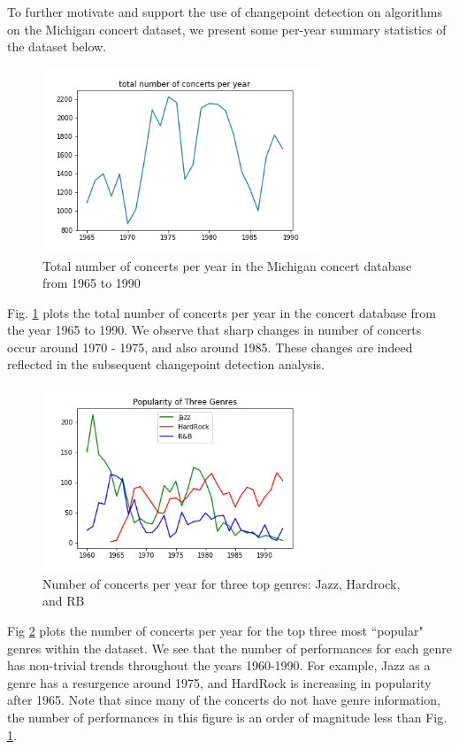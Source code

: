 \documentclass[9pt,twocolumn,twoside,lineno]{pnas-new}
\begin{document}
To further motivate and support the use of changepoint detection on algorithms on the Michigan concert dataset, we present some per-year summary statistics of the dataset below. 
\begin{figure}[!ht]
 \centering
    \includegraphics[width=83mm]{figures/TotalNumberofConcerts.png}
    \caption{Total number of concerts per year in the Michigan concert database from 1965 to 1990} \label {fig:num-concerts}
\end{figure}

Fig. \ref{fig:num-concerts} plots the total number of concerts per year in the concert database from the year 1965 to 1990. We observe that sharp changes in number of concerts occur around 1970 - 1975, and also around 1985. These changes are indeed reflected in the subsequent changepoint detection analysis. 
\begin{figure}[!ht]
 \centering
    \includegraphics[width=83mm]{figures/ThreeGenres.png}
    \caption{Number of concerts per year for three top genres: Jazz, Hardrock, and RB} \label {fig:num-genres}
\end{figure}

Fig \ref{fig:num-genres} plots the number of concerts per year for the top three most ``popular" genres within the dataset. We see that the number of performances for each genre has non-trivial trends throughout the years 1960-1990. For example, Jazz as a genre has a resurgence around 1975, and HardRock is increasing in popularity after 1965. Note that since many of the concerts do not have genre information, the number of performances in this figure is an order of magnitude less than Fig. \ref{fig:num-concerts}. 
\end{document}
